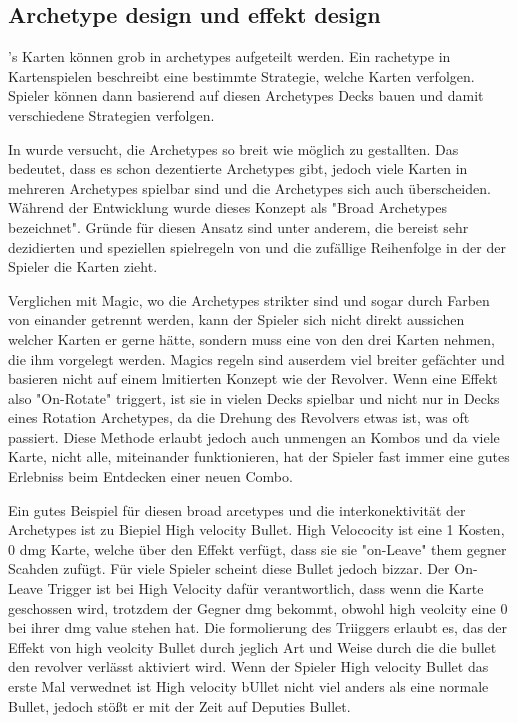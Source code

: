 \subsection{Archetype design und effekt design}\label{subsec:placementMatters}

\FF's Karten können grob in archetypes aufgeteilt werden. Ein rachetype in Kartenspielen beschreibt eine bestimmte Strategie, welche Karten verfolgen.
Spieler können dann basierend auf diesen Archetypes Decks bauen und damit verschiedene Strategien verfolgen.\cite{whatIsAnArchetype}


In \FF wurde versucht, die Archetypes so breit wie möglich zu gestallten. Das bedeutet, dass es schon dezentierte Archetypes
gibt, jedoch viele Karten in mehreren Archetypes spielbar sind und die Archetypes sich auch überscheiden.
Während der Entwicklung wurde dieses Konzept als "Broad Archetypes bezeichnet". Gründe für diesen Ansatz sind unter anderem,
die bereist sehr dezidierten und speziellen spielregeln von \FF  und die zufällige Reihenfolge in der der Spieler die Karten zieht.


Verglichen mit Magic, wo die Archetypes strikter sind und sogar durch Farben von einander getrennt werden, kann der
Spieler sich nicht direkt aussichen welcher Karten er gerne hätte, sondern muss eine von den drei Karten nehmen, die ihm vorgelegt werden.
Magics regeln sind auserdem viel breiter gefächter und basieren nicht auf einem lmitierten Konzept wie der Revolver.
Wenn eine Effekt also "On-Rotate" triggert, ist sie in vielen Decks spielbar und nicht nur in Decks eines Rotation Archetypes,
da die Drehung des Revolvers etwas ist, was oft passiert. Diese Methode erlaubt jedoch auch unmengen an Kombos und da
viele Karte, nicht alle, miteinander funktionieren, hat der Spieler fast immer eine gutes Erlebniss beim Entdecken einer neuen Combo.


Ein gutes Beispiel für diesen broad arcetypes und die interkonektivität der Archetypes ist zu Biepiel High velocity Bullet.
High Velococity ist eine 1 Kosten, 0 dmg Karte, welche über den Effekt verfügt, dass sie sie "on-Leave" them gegner Scahden zufügt.
Für viele Spieler scheint diese Bullet jedoch bizzar. Der On-Leave Trigger ist bei High Velocity dafür verantwortlich,
dass wenn die Karte geschossen wird, trotzdem der Gegner dmg bekommt, obwohl high veolcity eine 0 bei ihrer dmg value stehen hat.
Die formolierung des Triiggers erlaubt es, das der Effekt von high veolcity Bullet durch jeglich Art und Weise durch die die bullet den revolver verlässt aktiviert wird.
Wenn der Spieler High velocity Bullet das erste Mal verwednet ist High velocity bUllet nicht viel anders als eine normale Bullet,
jedoch stößt er mit der Zeit auf Deputies Bullet.


